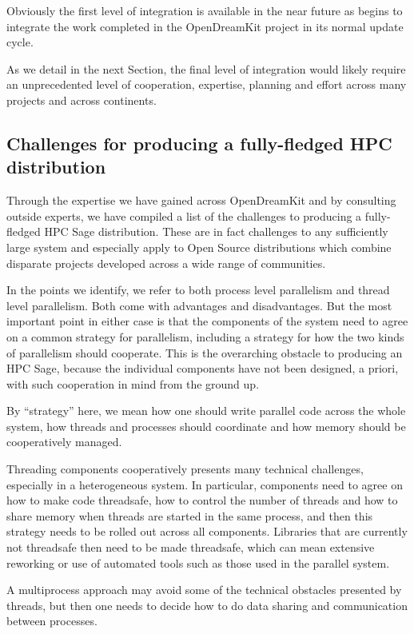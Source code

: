 \documentclass{deliverablereport}
\begin{document}
Obviously the first level of integration is available in the near future as \SageMath
begins to integrate the work completed in the OpenDreamKit project in its normal update
cycle.

As we detail in the next Section, the final level of integration would likely require an unprecedented level of
cooperation, expertise, planning and effort across many projects and across continents.

\subsection{Challenges for producing a fully-fledged HPC \SageMath distribution}

Through the expertise we have gained across OpenDreamKit and by consulting outside
experts, we have compiled a list of the challenges to producing a fully-fledged
HPC Sage distribution. These are in fact challenges to any sufficiently large system
and especially apply to Open Source distributions which combine disparate projects
developed across a wide range of communities.

In the points we identify, we refer to both process level parallelism and thread level
parallelism. Both come with advantages and disadvantages. But the most important point
in either case is that the components of the system need to agree on a common strategy
for parallelism, including a strategy for how the two kinds of parallelism should
cooperate. This is the overarching obstacle to producing an HPC Sage, because the individual
components have not been designed, a priori, with such cooperation in mind from the ground up.

By ``strategy'' here, we mean how one should write parallel code across the whole system, how
threads and processes should coordinate and how memory should be cooperatively managed.

Threading components cooperatively presents many technical challenges, especially in a
heterogeneous system. In particular, components need to agree on how to make code threadsafe,
how to control the number of threads and how to share memory when threads are started in the
same process, and then this strategy needs to be rolled out across all components. Libraries
that are currently not threadsafe then need to be made threadsafe, which can mean extensive
reworking or use of automated tools such as those used in the parallel \Singular system.

A multiprocess approach may avoid some of the technical obstacles presented by threads, but
then one needs to decide how to do data sharing and communication between processes.
\end{document}
